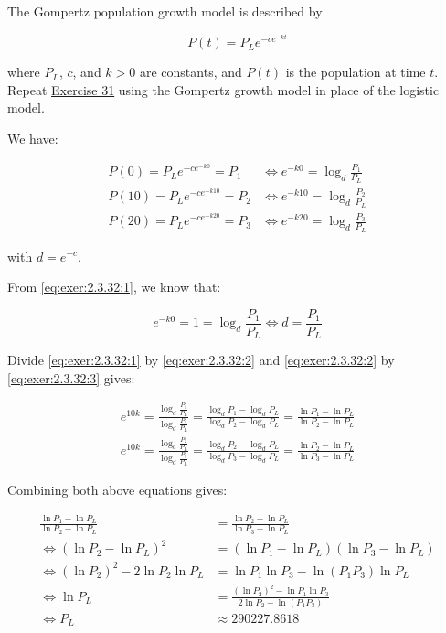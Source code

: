 \documentclass[../../../../Assignments]{subfiles}
\begin{document}
\begin{exercise}
    The Gompertz population growth model is described by

    \[P(t) = P_L e^{-ce^{-kt}}\]

    \noindent where \(P_L\), \(c\), and \(k > 0\) are constants, and \(P(t)\) is
    the population at time \(t\). Repeat \hyperref[exer:2.3.31]{Exercise 31}
    using the Gompertz growth model in place of the logistic model.
\end{exercise}

\begin{solution}
    We have:

    \begin{align*}
         P(0) = P_L e^{-ce^{-k0}}  = P_1 &\iff e^{-k0}  = \log_{d} \frac{P_1}{P_L} \tag{1}\label{eq:exer:2.3.32:1} \\
        P(10) = P_L e^{-ce^{-k10}} = P_2 &\iff e^{-k10} = \log_{d} \frac{P_2}{P_L} \tag{2}\label{eq:exer:2.3.32:2} \\
        P(20) = P_L e^{-ce^{-k20}} = P_3 &\iff e^{-k20} = \log_{d} \frac{P_3}{P_L} \tag{3}\label{eq:exer:2.3.32:3}
    \end{align*}

    \noindent with \(d = e^{-c}\).

    From \eqref{eq:exer:2.3.32:1}, we know that:

    \[e^{-k0} = 1 = \log_{d} \frac{P_1}{P_L} \iff d = \frac{P_1}{P_L}\]

    Divide \eqref{eq:exer:2.3.32:1} by \eqref{eq:exer:2.3.32:2} and
    \eqref{eq:exer:2.3.32:2} by \eqref{eq:exer:2.3.32:3} gives:

    \begin{gather*}
        e^{10k} = \frac{\log_{d} \frac{P_1}{P_L}}{\log_{d} \frac{P_2}{P_L}} = \frac{\log_{d} P_1 - \log_{d} P_L}{\log_{d} P_2 - \log_{d} P_L} = \frac{\ln P_1 - \ln P_L}{\ln P_2 - \ln P_L} \\
        e^{10k} = \frac{\log_{d} \frac{P_2}{P_L}}{\log_{d} \frac{P_3}{P_L}} = \frac{\log_{d} P_2 - \log_{d} P_L}{\log_{d} P_3 - \log_{d} P_L} = \frac{\ln P_2 - \ln P_L}{\ln P_3 - \ln P_L}
    \end{gather*}

    Combining both above equations gives:

    \begin{align*}
        \frac{\ln P_1 - \ln P_L}{\ln P_2 - \ln P_L} &= \frac{\ln P_2 - \ln P_L}{\ln P_3 - \ln P_L} \\
        \iff                  (\ln P_2 - \ln P_L)^2 &= (\ln P_1 - \ln P_L)(\ln P_3 - \ln P_L) \\
        \iff        (\ln P_2)^2 - 2 \ln P_2 \ln P_L &= \ln P_1 \ln P_3 - \ln(P_1 P_3) \ln P_L \\
        \iff                                \ln P_L &= \frac{(\ln P_2)^2 - \ln P_1 \ln P_3}{2 \ln P_2 - \ln(P_1 P_3)} \\
        \iff                                    P_L &\approx \num{290227.8618}
    \end{align*}


\end{solution}
\end{document}
